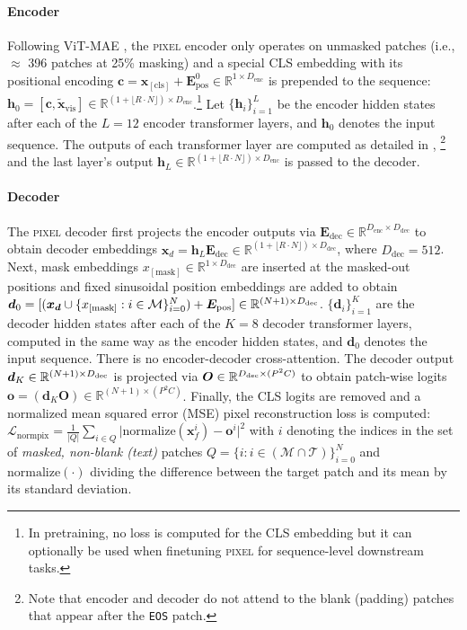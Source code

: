 \documentclass{article}
\def\floor#1{\lfloor #1 \rfloor}
\newcommand{\model}{\textsc{pixel}\xspace}
\begin{document}
\paragraph{Encoder} Following ViT-MAE \citep{he-etal-2022-mae}, the \model encoder only operates on unmasked patches (i.e., $\approx$ 396 patches at 25\% masking) and a special CLS embedding with its positional encoding ${\bm{c} = \bm{x}_{[\text{cls}]} + \bm{E}_{\text{pos}}^0 \in \mathbb{R}^{1 \times D_{\text{enc}}}}$ is prepended to the sequence: $\bm{h}_0 = [\bm{c}, \bm{\tilde{x}}_{\text{vis}}] \in \mathbb{R}^{(1 + \floor{R\cdot N}) \times D_{\text{enc}}}$.\footnote{In pretraining, no loss is computed for the CLS embedding but it can optionally be used when finetuning \model for sequence-level downstream tasks.} Let $\{\bm{h}_i\}_{i=1}^L$ be the encoder hidden states after each of the $L=12$ encoder transformer layers, and $\bm{h}_0$ denotes the input sequence. The outputs of each transformer layer are computed as detailed in \citep{DBLP:conf/nips/VaswaniSPUJGKP17}, \footnote{Note that encoder and decoder do not attend to the blank (padding) patches that appear after the {\footnotesize \texttt{EOS}} patch.} and the last layer's output $\bm{h}_L \in \mathbb{R}^{(1 + \floor{R\cdot N}) \times D_{\text{enc}}}$ is passed to the decoder.

\paragraph{Decoder} The \model decoder first projects the encoder outputs via $\bm{E}_{\text{dec}} \in \mathbb{R}^{D_{\text{enc}} \times D_{\text{dec}}}$ to obtain decoder embeddings $\bm{x}_d = \bm{h}_L\bm{E}_{\text{dec}} \in \mathbb{R}^{(1 + \floor{R\cdot N}) \times D_{\text{dec}}}$, where $D_{\text{dec}}=512$.
Next, mask embeddings $x_{[\text{mask}]} \in \mathbb{R}^{1\times D_{\text{dec}}}$ are inserted at the masked-out positions and fixed sinusoidal position embeddings are added to obtain
$\bm{d}_0 = [(\bm{x_d} \cup \{ x_{[\text{mask}]}: i \in \mathcal{M}\}_{i=0}^N) + \bm{E}_{\text{pos}}] \in \mathbb{R}^{(N + 1) \times D_{\text{\text{dec}}}}$. $\{\bm{d}_i\}_{i=1}^K$ are the decoder hidden states after each of the $K=8$ decoder transformer layers, computed in the same way as the encoder hidden states, and $\bm{d}_0$ denotes the input sequence. There is no encoder-decoder cross-attention. The decoder output $\bm{d}_K \in \mathbb{R}^{(N + 1) \times D_{\text{\text{dec}}}}$ is projected via $\bm{O} \in \mathbb{R}^{D_{\text{\text{dec}}} \times (P^2C)}$ to obtain patch-wise logits $\bm{o} = (\bm{d}_K \bm{O}) \in \mathbb{R}^{(N + 1) \times (P^2C)}$. Finally, the CLS logits are removed and a normalized mean squared error (MSE) pixel reconstruction loss is computed: $\bm{\mathcal{L}}_{\text{normpix}} = \frac{1}{ \lvert Q \rvert } \sum_{i \in Q}{\lvert \text{normalize}(\bm{x}_f^i) - \bm{o}^i\rvert^2}$ with $i$ denoting the indices in the set of \emph{masked, non-blank (text)} patches $Q = \{i: i \in (\mathcal{M} \cap \mathcal{T})\}_{i=0}^N$ and $\text{normalize}(\cdot)$ dividing the difference between the target patch and its mean by its standard deviation.
\end{document}
